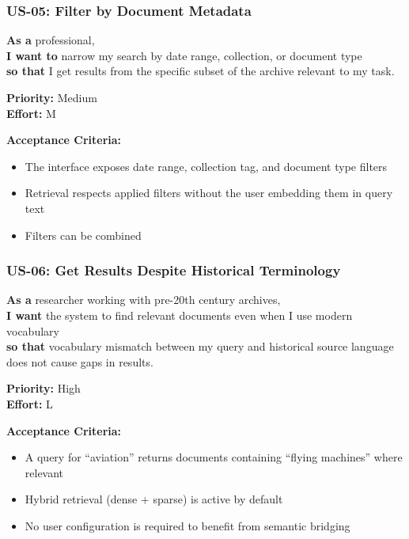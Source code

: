 \documentclass[
  11pt,
]{article}
\providecommand{\tightlist}{%
  \setlength{\itemsep}{0pt}\setlength{\parskip}{0pt}}
\begin{document}
\subsubsection{US-05: Filter by Document
Metadata}\label{us-05-filter-by-document-metadata}

\textbf{As a} professional,\\
\textbf{I want to} narrow my search by date range, collection, or
document type\\
\textbf{so that} I get results from the specific subset of the archive
relevant to my task.

\textbf{Priority:} Medium\\
\textbf{Effort:} M

\textbf{Acceptance Criteria:}

\begin{itemize}
\tightlist
\item
  The interface exposes date range, collection tag, and document type
  filters
\item
  Retrieval respects applied filters without the user embedding them in
  query text
\item
  Filters can be combined
\end{itemize}

\subsubsection{US-06: Get Results Despite Historical
Terminology}\label{us-06-get-results-despite-historical-terminology}

\textbf{As a} researcher working with pre-20th century archives,\\
\textbf{I want} the system to find relevant documents even when I use
modern vocabulary\\
\textbf{so that} vocabulary mismatch between my query and historical
source language does not cause gaps in results.

\textbf{Priority:} High\\
\textbf{Effort:} L

\textbf{Acceptance Criteria:}

\begin{itemize}
\tightlist
\item
  A query for ``aviation'' returns documents containing ``flying
  machines'' where relevant
\item
  Hybrid retrieval (dense + sparse) is active by default
\item
  No user configuration is required to benefit from semantic bridging
\end{itemize}
\end{document}

